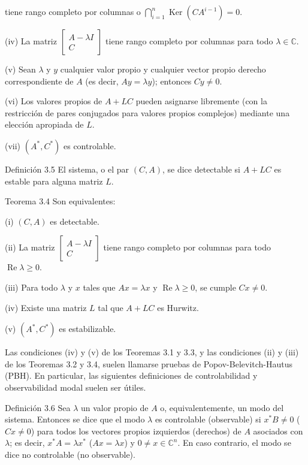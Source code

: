tiene rango completo por columnas o $\bigcap_{i=1}^{n} \operatorname{Ker}\left(C A^{i-1}\right)=0$.

(iv) La matriz $\left[\begin{array}{c}A-\lambda I \\ C\end{array}\right]$ tiene rango completo por columnas para todo $\lambda \in \mathbb{C}$.

(v) Sean $\lambda$ y $y$ cualquier valor propio y cualquier vector propio derecho correspondiente de $A$ (es decir, $A y=\lambda y$); entonces $C y \neq 0$.

(vi) Los valores propios de $A+L C$ pueden asignarse libremente (con la restricción de pares conjugados para valores propios complejos) mediante una elección apropiada de $L$.

(vii) $\left(A^{*}, C^{*}\right)$ es controlable.

Definición 3.5 El sistema, o el par $(C, A)$, se dice detectable si $A+L C$ es estable para alguna matriz $L$.

Teorema 3.4 Son equivalentes:

(i) $(C, A)$ es detectable.

(ii) La matriz $\left[\begin{array}{c}A-\lambda I \\ C\end{array}\right]$ tiene rango completo por columnas para todo $\operatorname{Re} \lambda \geq 0$.

(iii) Para todo $\lambda$ y $x$ tales que $A x=\lambda x$ y $\operatorname{Re} \lambda \geq 0$, se cumple $C x \neq 0$.

(iv) Existe una matriz $L$ tal que $A+L C$ es Hurwitz.

(v) $\left(A^{*}, C^{*}\right)$ es estabilizable.

Las condiciones (iv) y (v) de los Teoremas 3.1 y 3.3, y las condiciones (ii) y (iii) de los Teoremas 3.2 y 3.4, suelen llamarse pruebas de Popov-Belevitch-Hautus (PBH). En particular, las siguientes definiciones de controlabilidad y observabilidad modal suelen ser útiles.

Definición 3.6 Sea $\lambda$ un valor propio de $A$ o, equivalentemente, un modo del sistema. Entonces se dice que el modo $\lambda$ es controlable (observable) si $x^{*} B \neq 0$ ($C x \neq 0$) para todos los vectores propios izquierdos (derechos) de $A$ asociados con $\lambda$; es decir, $x^{*} A=\lambda x^{*}$ ($A x=\lambda x$) y $0 \neq x \in \mathbb{C}^{n}$. En caso contrario, el modo se dice no controlable (no observable).

